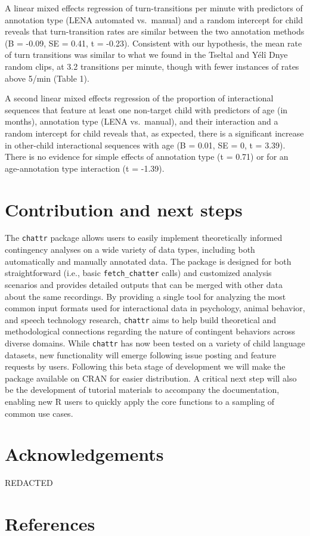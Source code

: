 \documentclass[10pt, letterpaper]{article}
\begin{document}
A linear mixed effects regression of turn-transitions per minute with
predictors of annotation type (LENA automated vs.~manual) and a random
intercept for child reveals that turn-transition rates are similar
between the two annotation methods (B = -0.09, SE = 0.41, t = -0.23).
Consistent with our hypothesis, the mean rate of turn transitions was
similar to what we found in the Tseltal and Yélî Dnye random clips, at
3.2 transitions per minute, though with fewer instances of rates above
5/min (Table 1).

A second linear mixed effects regression of the proportion of
interactional sequences that feature at least one non-target child with
predictors of age (in months), annotation type (LENA vs.~manual), and
their interaction and a random intercept for child reveals that, as
expected, there is a significant increase in other-child interactional
sequences with age (B = 0.01, SE = 0, t = 3.39). There is no evidence
for simple effects of annotation type (t = 0.71) or for an
age-annotation type interaction (t = -1.39).

\hypertarget{contribution-and-next-steps}{%
\section{Contribution and next
steps}\label{contribution-and-next-steps}}

The \texttt{chattr} package allows users to easily implement
theoretically informed contingency analyses on a wide variety of data
types, including both automatically and manually annotated data. The
package is designed for both straightforward (i.e., basic
\texttt{fetch\_chatter} calls) and customized analysis scenarios and
provides detailed outputs that can be merged with other data about the
same recordings. By providing a single tool for analyzing the most
common input formats used for interactional data in psychology, animal
behavior, and speech technology research, \texttt{chattr} aims to help
build theoretical and methodological connections regarding the nature of
contingent behaviors across diverse domains. While \texttt{chattr} has
now been tested on a variety of child language datasets, new
functionality will emerge following issue posting and feature requests
by users. Following this beta stage of development we will make the
package available on CRAN for easier distribution. A critical next step
will also be the development of tutorial materials to accompany the
documentation, enabling new R users to quickly apply the core functions
to a sampling of common use cases.

\hypertarget{acknowledgements}{%
\section{Acknowledgements}\label{acknowledgements}}

REDACTED

\hypertarget{references}{%
\section{References}\label{references}}

\setlength{\parindent}{-0.1in} 
\setlength{\leftskip}{0.125in}

\noindent


\end{document}
